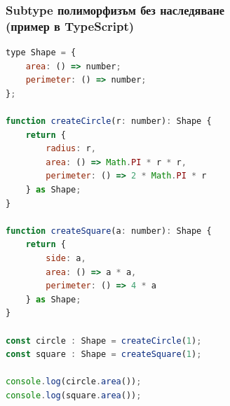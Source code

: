 \documentclass{beamer}
\begin{document}
\begin{frame}[fragile]
\frametitle{Subtype полиморфизъм без наследяване \\ (пример в TypeScript)}

\begin{lstlisting}[basicstyle=\tiny,language=JavaScript]
type Shape = {
    area: () => number;
    perimeter: () => number;
};

function createCircle(r: number): Shape {
    return {
        radius: r,
        area: () => Math.PI * r * r,
        perimeter: () => 2 * Math.PI * r
    } as Shape;
}

function createSquare(a: number): Shape {
    return {
        side: a, 
        area: () => a * a,
        perimeter: () => 4 * a
    } as Shape;
}

const circle : Shape = createCircle(1);
const square : Shape = createSquare(1);

console.log(circle.area()); 
console.log(square.area()); \end{lstlisting}

\end{frame}



\end{document}
